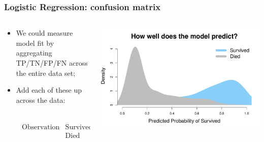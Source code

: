 \documentclass[aspectratio=169]{beamer}
\theoremstyle{principle}
\begin{document}
\begin{frame}
\frametitle{Logistic Regression: confusion matrix}

\begin{columns}
\begin{column}{0.5\textwidth}

\begin{itemize}
\item We could measure model fit by aggregating TP/TN/FP/FN across the entire data set;
\bigskip
\bigskip

\item Add each of these up across the data:
\begin{align*}
\begin{array}{cccc}
&&\mbox{Prediction}&\\
&&\mbox{Survived}&\mbox{Died}\\
\mbox{Observation}&\mbox{Survived}&239&103\\
&\mbox{Died}&73&472\\
\end{array}
\end{align*}

\end{itemize}

\end{column}
\begin{column}{0.5\textwidth}

\includegraphics[scale=0.35]{titanic_prediction_dens.pdf}

\end{column}
\end{columns}

\end{frame}
\end{document}
